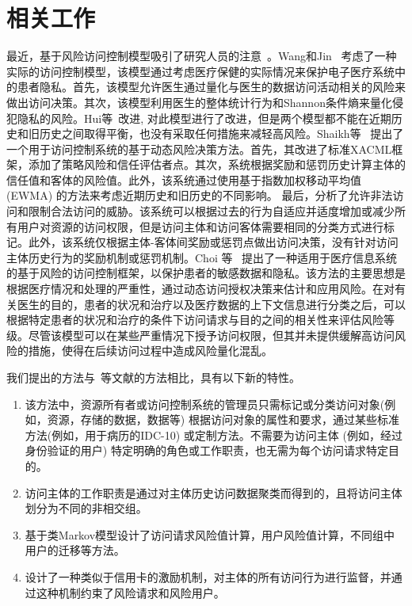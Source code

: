 \section{相关工作}
\label{sec:relate}
最近，基于风险访问控制模型吸引了研究人员的注意~\cite{wang2011quantified,shaikh2012dynamic,choi2015framework}。Wang和Jin~\cite{wang2011quantified} 考虑了一种实际的访问控制模型，该模型通过考虑医疗保健的实际情况来保护电子医疗系统中的患者隐私。首先，该模型允许医生通过量化与医生的数据访问活动相关的风险来做出访问决策。其次，该模型利用医生的整体统计行为和Shannon条件熵来量化侵犯隐私的风险。Hui等~\cite{hui2015risk}改进, 对此模型进行了改进，但是两个模型都不能在近期历史和旧历史之间取得平衡，也没有采取任何措施来减轻高风险。Shaikh等~\cite{shaikh2012dynamic} 提出了一个用于访问控制系统的基于动态风险决策方法。首先，其改进了标准XACML框架，添加了策略风险和信任评估者点。其次，系统根据奖励和惩罚历史计算主体的信任值和客体的风险值。此外，该系统通过使用基于指数加权移动平均值 (EWMA) 的方法来考虑近期历史和旧历史的不同影响。 最后，分析了允许非法访问和限制合法访问的威胁。该系统可以根据过去的行为自适应并适度增加或减少所有用户对资源的访问权限，但是访问主体和访问客体需要相同的分类方式进行标记。此外，该系统仅根据主体-客体间奖励或惩罚点做出访问决策，没有针对访问主体历史行为的奖励机制或惩罚机制。Choi 等~\cite{choi2015framework}  提出了一种适用于医疗信息系统的基于风险的访问控制框架，以保护患者的敏感数据和隐私。该方法的主要思想是根据医疗情况和处理的严重性，通过动态访问授权决策来估计和应用风险。在对有关医生的目的，患者的状况和治疗以及医疗数据的上下文信息进行分类之后，可以根据特定患者的状况和治疗的条件下访问请求与目的之间的相关性来评估风险等级。尽管该模型可以在某些严重情况下授予访问权限，但其并未提供缓解高访问风险的措施，使得在后续访问过程中造成风险量化混乱。

我们提出的方法与~\cite{wang2011quantified,shaikh2012dynamic,choi2015framework}等文献的方法相比，具有以下新的特性。

\begin{enumerate}
	\item 该方法中，资源所有者或访问控制系统的管理员只需标记或分类访问对象(例如，资源，存储的数据，数据等) 根据访问对象的属性和要求，通过某些标准方法(例如，用于病历的IDC-10) 或定制方法。不需要为访问主体 (例如，经过身份验证的用户) 特定明确的角色或工作职责，也无需为每个访问请求特定目的。
	\item 访问主体的工作职责是通过对主体历史访问数据聚类而得到的，且将访问主体划分为不同的非相交组。
	\item 基于类Markov模型设计了访问请求风险值计算，用户风险值计算，不同组中用户的迁移等方法。
	\item 设计了一种类似于信用卡的激励机制，对主体的所有访问行为进行监督，并通过这种机制约束了风险请求和风险用户。
\end{enumerate}

